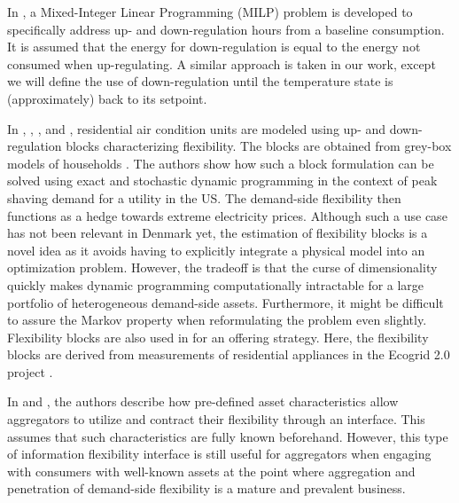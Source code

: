 In \cite{de2019leveraging}, a Mixed-Integer Linear Programming (MILP) problem  is developed to specifically address up- and down-regulation hours from a baseline consumption. It is assumed that the energy for down-regulation is equal to the energy not consumed when up-regulating. A similar approach is taken in our work, except we will define the use of down-regulation until the temperature state is (approximately) back to its setpoint.

In \cite{schaperow2019simulation}, \cite{chanpiwat2020using}, \cite{moglen2020optimal}, and \cite{moglen2020optimal}, residential air condition units are modeled using up- and down-regulation blocks characterizing flexibility. The blocks are obtained from grey-box models of households \cite{siemann2013performance}. The authors show how such a block formulation can be solved using exact and stochastic dynamic programming in the context of peak shaving demand for a utility in the US. The demand-side flexibility then functions as a hedge towards extreme electricity prices. Although such a use case has not been relevant in Denmark yet, the estimation of flexibility blocks is a novel idea as it avoids having to explicitly integrate a physical model into an optimization problem. However, the tradeoff is that the curse of dimensionality quickly makes dynamic programming computationally intractable for a large portfolio of heterogeneous demand-side assets. Furthermore, it might be difficult to assure the Markov property \cite{MarkovProperty} when reformulating the problem even slightly. Flexibility blocks are also used in \cite{bobo2018offering} for an offering strategy. Here, the flexibility blocks are derived from measurements of residential appliances in the Ecogrid 2.0 project \cite{ecogrid}.

In \cite{biegel2013information} and \cite{BiegelConstractingFlexServices}, the authors describe how pre-defined asset characteristics allow aggregators to utilize and contract their flexibility through an interface. This assumes that such characteristics are fully known beforehand. However, this type of information flexibility interface is still useful for aggregators when engaging with consumers with well-known assets at the point where aggregation and penetration of demand-side flexibility is a mature and prevalent business.

